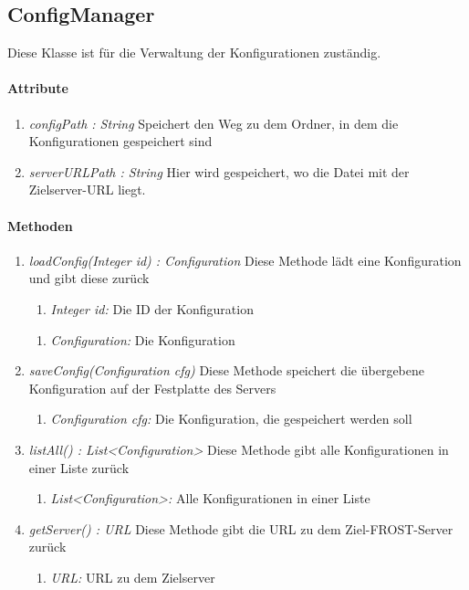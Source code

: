 
\subsection{ConfigManager}
Diese Klasse ist für die Verwaltung der Konfigurationen zuständig.
\paragraph{Attribute}
\begin{enumerate}[-]
	\item \textit{configPath : String} Speichert den Weg zu dem Ordner, in dem die Konfigurationen gespeichert sind
	
	\item \textit{serverURLPath : String} Hier wird gespeichert, wo die Datei mit der Zielserver-URL liegt.		
\end{enumerate}

\paragraph{Methoden}
	
\begin{enumerate}[+]
	\item \textit{loadConfig(Integer id) : Configuration} Diese Methode lädt eine Konfiguration und gibt diese zurück
		\begin{enumerate}[$\bullet$]
			\item \textit{Integer id:} Die ID der Konfiguration
		\end{enumerate}
		\vspace{-0.2cm}
		\begin{enumerate}[$\circ$]
			\item \textit{Configuration:} Die Konfiguration
		\end{enumerate}
	
	\item \textit{saveConfig(Configuration cfg)} Diese Methode speichert die übergebene Konfiguration auf der Festplatte des Servers
	\begin{enumerate}[$\bullet$]
		\item \textit{Configuration cfg:} Die Konfiguration, die gespeichert werden soll
	\end{enumerate}
	
	\item \textit{listAll() : List<Configuration>} Diese Methode gibt alle Konfigurationen in einer Liste zurück	
	\begin{enumerate}[$\circ$]
		\item \textit{List<Configuration>:} Alle Konfigurationen in einer Liste
	\end{enumerate}
	
	\item \textit{getServer() : URL} Diese Methode gibt die URL zu dem Ziel-FROST-Server zurück
	\begin{enumerate}[$\circ$]
		\item \textit{URL:} URL zu dem Zielserver
	\end{enumerate}
\end{enumerate}
